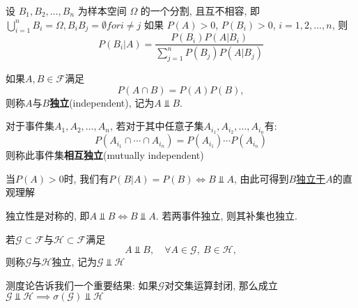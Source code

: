 \begin{theorem}[Bayes定理]
    设 $B_1, B_2, \dotsc, B_n$ 为样本空间 $\Omega$ 的一个分割, 且互不相容, 即$\bigcup _{i=1} ^n B_i = \Omega, B_i B_j= \emptyset for i \neq j $
    如果 $P(A) > 0$, $P(B_i) > 0$, $i = 1,2, \dotsc, n$,
    则
    \begin{equation}
        P (B_i | A) = \frac{P(B_i) P(A|B_i)}{\sum_{j=1}^n P(B_j) P(A|B_j)}
    \end{equation}
\end{theorem}

\begin{definition}[事件的独立性]
    如果$A,B\in\mathscr{F}$满足
    \[ P(A\cap B) = P(A)P(B), \]
    则称$A$与$B$\textbf{独立}(independent), 记为$A \Vbar B$.

    对于事件集$A_1, A_2, \dotsc, A_n$, 若对于其中任意子集$A_{i_1}, A_{i_2}, \dotsc, A_{i_n}$有:
    \[ P(A_{i_1} \cap \cdots  \cap A_{i_n}) =P(A_{i_1})\cdots P(A_{i_n})  \]
    则称此事件集\textbf{相互独立}(mutually independent)
\end{definition}

\begin{note}
    当$P(A)>0$时, 我们有$ P(B|A) = P(B) \iff B \Vbar A$, 由此可得到\underline{$B$独立于$A$}的直观理解
\end{note}

\begin{property}
    独立性是对称的, 即$A \Vbar B \iff B \Vbar A$. 若两事件独立, 则其补集也独立.
    \begin{center}
    \end{center}
\end{property}

\begin{definition}[事件域的独立性]
    若$\mathscr{G} \subset \mathscr{F}$与$\mathscr{H} \subset \mathscr{F}$满足
    \[ A \Vbar B, \quad \forall A\in\mathscr{G},\ B\in\mathscr{H}, \]
    则称$\mathscr{G}$与$\mathscr{H}$独立, 记为$\mathscr{G} \Vbar \mathscr{H}$
\end{definition}

测度论告诉我们一个重要结果: 如果$\mathscr{G}$对交集运算封闭, 那么成立$\mathscr{G}\Vbar\mathscr{H} \implies \sigma(\mathscr{G}) \Vbar \mathscr{H}$
